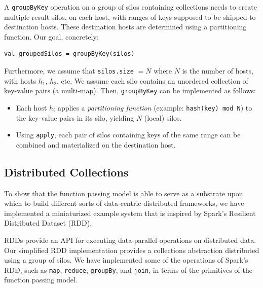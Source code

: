 \documentclass{jfp1}
\begin{document}
A \verb|groupByKey| operation on a group of silos containing collections needs
to create multiple result silos, on each host, with ranges of keys supposed to
be shipped to destination hosts. These destination hosts are determined using a
partitioning function. Our goal, concretely:

\begin{lstlisting}
val groupedSilos = groupByKey(silos)
\end{lstlisting}
\noindent
Furthermore, we assume that \verb|silos.size| $= N$ where $N$ is the number of
hosts, with hosts $h_1$, $h_2$, etc. We assume each silo contains an unordered
collection of key-value pairs (a multi-map). Then, \verb|groupByKey| can be
implemented as follows:

\begin{itemize}
  \item Each host $h_i$ applies a {\em partitioning function} (example:
    \texttt{hash(key) mod N}) to the key-value pairs in its silo, yielding $N$
    (local) silos.

  \item Using \verb|apply|, each pair of silos containing keys of the same
    range can be combined and materialized on the destination host.
\end{itemize}


\subsection{Distributed Collections}\label{sec:rdd}

To show that the function passing model is able to serve as a
substrate upon which to build different sorts of data-centric
distributed frameworks, we have implemented a miniaturized example
system that is inspired by Spark's Resilient Distributed
Dataset (RDD).

RDDs provide an API for executing data-parallel operations on
distributed data. Our simplified RDD implementation provides a
collections abstraction distributed using a group of silos. We have
implemented some of the operations of Spark's RDD, such as \verb|map|,
\verb|reduce|, \verb|groupBy|, and \verb|join|, in terms of the
primitives of the function passing model.
\end{document}

